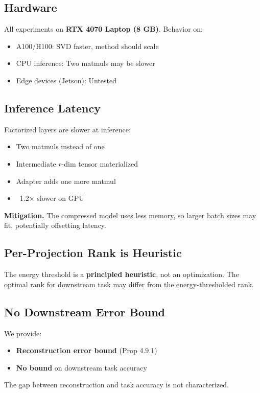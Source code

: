 \subsection{Hardware}

All experiments on \textbf{RTX 4070 Laptop (8 GB)}. Behavior on:
\begin{itemize}
\item A100/H100: SVD faster, method should scale
\item CPU inference: Two matmuls may be slower
\item Edge devices (Jetson): Untested

\end{itemize}
\subsection{Inference Latency}

Factorized layers are slower at inference:
\begin{itemize}
\item Two matmuls instead of one
\item Intermediate $r$-dim tensor materialized
\item Adapter adds one more matmul
\item ~1.2$\times$ slower on GPU

\end{itemize}
\textbf{Mitigation.} The compressed model uses less memory, so larger batch sizes 
may fit, potentially offsetting latency.

\subsection{Per-Projection Rank is Heuristic}

The energy threshold is a \textbf{principled heuristic}, not an optimization. The 
optimal rank for downstream task may differ from the energy-thresholded rank.

\subsection{No Downstream Error Bound}

We provide:
\begin{itemize}
\item \textbf{Reconstruction error bound} (Prop 4.9.1)
\item \textbf{No bound} on downstream task accuracy

\end{itemize}
The gap between reconstruction and task accuracy is not characterized.

